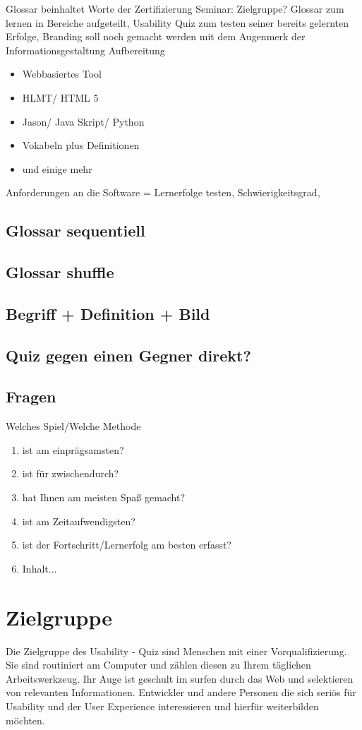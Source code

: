 \documentclass[a4paper, 12pt, twoside, BCOR=20mm, DIV=calc, abstracton, parskip=half*, toc=bibliography, toc=listof, headsepline, footsepline, headings=small, numbers=enddot]{scrreprt}
\begin{document}
	Glossar beinhaltet Worte der Zertifizierung Seminar: Zielgruppe? 
	Glossar zum lernen in Bereiche aufgeteilt, Usability Quiz zum testen seiner bereits gelernten Erfolge, 
	Branding soll noch gemacht werden mit dem Augenmerk der Informationsgestaltung Aufbereitung
	\begin{itemize}
		\item{Webbasiertes Tool}
		\item{HLMT/ HTML 5}
		\item{Jason/ Java Skript/ Python}
		\item{Vokabeln plus Definitionen}
		\item und einige mehr  
	\end{itemize}
	
	Anforderungen an die Software = Lernerfolge testen, Schwierigkeitsgrad, 
	
	\subsection{Glossar sequentiell}
	\subsection{Glossar shuffle}
	\subsection{Begriff + Definition + Bild}
	\subsection{Quiz gegen einen Gegner direkt?}
	\subsection{Fragen}
	Welches Spiel/Welche Methode
	\begin{enumerate}
		\item  ist am einprägsamsten?
		\item  ist für zwischendurch?
		\item  hat Ihnen am meisten Spaß gemacht?
		\item  ist am Zeitaufwendigsten?
		\item  ist der Fortschritt/Lernerfolg am besten erfasst?
		\item Inhalt...
	\end{enumerate}
	
	\section{Zielgruppe}
	Die Zielgruppe des Usability - Quiz sind Menschen mit einer Vorqualifizierung. Sie sind routiniert am Computer und zählen diesen zu Ihrem täglichen Arbeitswerkzeug. 
	Ihr Auge ist geschult im surfen durch das Web und selektieren von relevanten Informationen. 
	Entwickler und andere Personen die sich seriös für Usability und der User Experience interessieren und hierfür weiterbilden möchten. 
	
\end{document}
